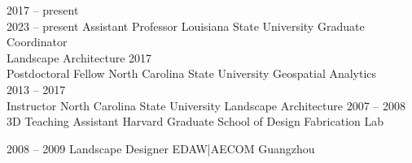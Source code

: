 \documentclass[10pt]{developercv} %
\begin{document}
\vspace*{-0.3cm}

\begin{entrylist}
	\entry
		{2017 -- present \\ 2023 -- present}
		{Assistant Professor}
		{Louisiana State University}
		{Graduate Coordinator\\
		Landscape Architecture}
	\entry
		{2017\\\footnotesize{}}
		{Postdoctoral Fellow}
		{North Carolina State University}
		{Geospatial Analytics\\
		}
	\entry
		{2013 -- 2017\\\footnotesize{}}
		{Instructor}
		{North Carolina State University}
		{Landscape Architecture}
	\entry
		{2007 -- 2008\\\footnotesize{}}
		{3D Teaching Assistant}
		{Harvard Graduate School of Design}
		{Fabrication Lab\\
		}
\end{entrylist}

\vspace*{-0.4cm}

\begin{entrylist}
	\entry
		{2008 -- 2009}
		{Landscape Designer}
		{EDAW|AECOM Guangzhou}
		{}
\end{entrylist}



\nocite{*}
\setlength\bibitemsep{0.75em}

\printbibliography[title={\cvsect{Books}}, type=book, heading=subbibliography]

\printbibliography[title={\cvsect{Papers}}, keyword=peer_reviewed, heading=subbibliography]

\clearpage

\printbibliography[title={\cvsect{Chapters}}, type=incollection, heading=subbibliography]

\printbibliography[title={\cvsect{Select presentations}}, type=unpublished, heading=subbibliography]
\end{document}
